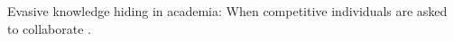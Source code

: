 





Evasive knowledge hiding in academia: When competitive individuals are asked to collaborate \citep{hernaus2019evasive}.